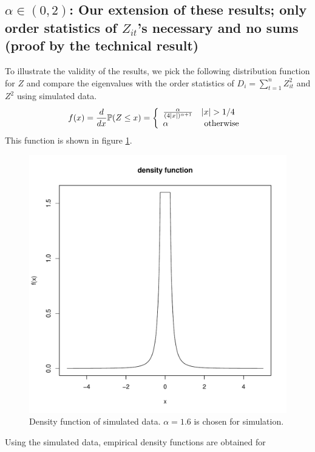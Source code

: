 \documentclass[11pt,reqno]{amsart}
\renewcommand{\P}{\mathbb{P}}
\newcommand{\1}{\mathds{1}}
\newcommand{\0}{\boldsymbol{0}}
\newcommand{\4}{\mathchoice{\mskip1.5mu}{\mskip1.5mu}{}{}}
\newcommand{\5}{\mathchoice{\mskip-1.5mu}{\mskip-1.5mu}{}{}}
\newcommand{\2}{\penalty250\mskip\thickmuskip\mskip-\thinmuskip} %
\begin{document}
\subsection{\texorpdfstring{$\alpha \in (0,2)$}{alpha in (0,2)}: Our
  extension of these results; only order statistics of \texorpdfstring{$Z_{it}$}{Z[it]}'s
  necessary and no sums (proof by the technical result)}
To illustrate the validity of the results, we pick the following
distribution function for $Z$ and compare the eigenvalues with
the order statistics of $D_i = \sum_{t=1}^n Z_{it}^2$ and $Z^2$ using
simulated data.
\begin{equation}
  \label{eq:mydist}
  f(x) = {d \over dx}\P(Z \leq x) = \left\{
    \begin{array}{ll}
      {\alpha \over (4|x|)^{\alpha + 1}} & |x| > 1/4 \\
      \alpha & \text{ otherwise }
    \end{array}
  \right.
\end{equation}
This function is shown in figure \ref{fig:densitySim}.
\begin{figure}[htb!]
  \centering
  \includegraphics[scale=0.40]{densitySim.pdf}
  \caption{Density function of simulated data. $\alpha=1.6$ is chosen
    for simulation.}
  \label{fig:densitySim}
\end{figure}
Using the simulated data, empirical density functions are obtained for
\end{document}
